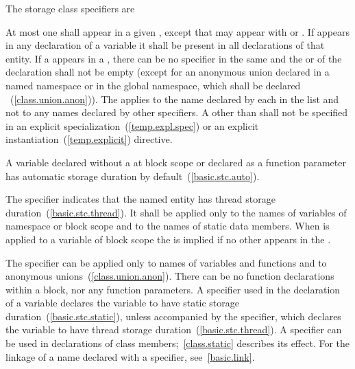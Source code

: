 \pnum
The storage class specifiers are

\begin{bnf}
\br
    \br
    \br
    \br
\end{bnf}

At most one  shall appear in a given
, except that  may appear with  or 
. If  appears in any declaration of
a variable it shall be present in all declarations of that entity. If a 
appears in a , there can be no
 specifier in the same  and
the  or 
of the declaration shall not be
empty (except for an anonymous union declared in a named namespace or in the
global namespace, which shall be declared
%
~(\ref{class.union.anon})). The
 applies to the name declared by each
 in the list and not to any names declared by
other specifiers. A 
other than 
shall not be
specified in an explicit specialization~(\ref{temp.expl.spec}) or an
explicit instantiation~(\ref{temp.explicit}) directive.

\pnum
\enternote
A variable declared without a 
at block scope or declared as a function parameter
has automatic storage duration by default~(\ref{basic.stc.auto}).
\exitnote

\pnum
The  specifier
indicates that the named entity has thread storage duration~(\ref{basic.stc.thread}). It
shall be applied only
to the names of variables of namespace
or block scope and to the names of static data members.
When  is applied to a variable of block scope the
  is implied if no other
 appears in the
.

\pnum
{}%
The  specifier can be applied only to names of variables and
functions and to anonymous unions~(\ref{class.union.anon}). There can be no
 function declarations within a block, nor any
 function parameters. A  specifier used in
the declaration of a variable declares the variable to have static storage
duration~(\ref{basic.stc.static}), unless accompanied by the
 specifier, which declares the variable to have thread
storage duration~(\ref{basic.stc.thread}). A  specifier can be
used in declarations of class members;~\ref{class.static} describes its
effect.
%
For the linkage of a name declared with a  specifier,
see~\ref{basic.link}.


